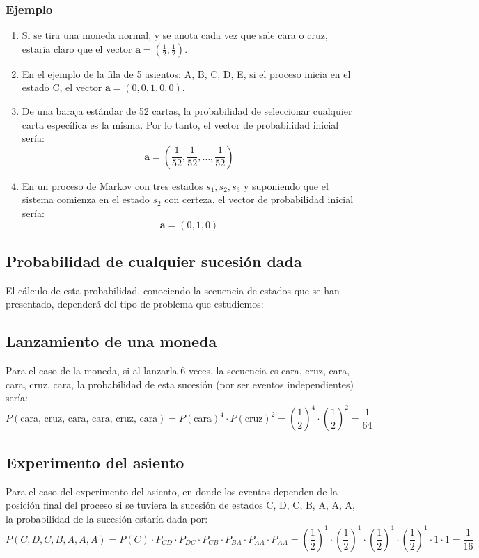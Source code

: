 \documentclass{article}
\begin{document}
\subsubsection{Ejemplo}

\begin{enumerate}
    \item Si se tira una moneda normal, y se anota cada vez que sale cara o cruz, estaría claro que el vector \( \mathbf{a} = \left(\frac{1}{2}, \frac{1}{2}\right) \).
    \item En el ejemplo de la fila de 5 asientos: A, B, C, D, E, si el proceso inicia en el estado C, el vector \( \mathbf{a} = (0, 0, 1, 0, 0) \).
    \item De una baraja estándar de 52 cartas, la probabilidad de seleccionar cualquier carta específica es la misma. Por lo tanto, el vector de probabilidad inicial sería:
          \[ \mathbf{a} = \left(\frac{1}{52}, \frac{1}{52}, \ldots, \frac{1}{52}\right) \]
    \item En un proceso de Markov con tres estados \( s_1, s_2, s_3 \) y suponiendo que el sistema comienza en el estado \( s_2 \) con certeza, el vector de probabilidad inicial sería:
          \[ \mathbf{a} = (0, 1, 0) \]
\end{enumerate}

\subsection*{Probabilidad de cualquier sucesión dada}

El cálculo de esta probabilidad, conociendo la secuencia de estados que se han presentado, dependerá del tipo de problema que estudiemos:

\subsection*{Lanzamiento de una moneda}
Para el caso de la moneda, si al lanzarla 6 veces, la secuencia es cara, cruz, cara, cara, cruz, cara, la probabilidad de esta sucesión (por ser eventos independientes) sería:
\begin{equation}
    P(\text{cara, cruz, cara, cara, cruz, cara}) = P(\text{cara})^4 \cdot P(\text{cruz})^2 = \left(\frac{1}{2}\right)^4 \cdot \left(\frac{1}{2}\right)^2 = \frac{1}{64}
\end{equation}

\subsection*{Experimento del asiento}
Para el caso del experimento del asiento, en donde los eventos dependen de la posición final del proceso si se tuviera la sucesión de estados C, D, C, B, A, A, A, la probabilidad de la sucesión estaría dada por:
\begin{equation}
    P(C, D, C, B, A, A, A) = P(C) \cdot P_{CD} \cdot P_{DC} \cdot P_{CB} \cdot P_{BA} \cdot P_{AA} \cdot P_{AA} = \left(\frac{1}{2}\right)^1 \cdot \left(\frac{1}{2}\right)^1 \cdot \left(\frac{1}{2}\right)^1 \cdot \left(\frac{1}{2}\right)^1 \cdot 1 \cdot 1 = \frac{1}{16}
\end{equation}
\end{document}
